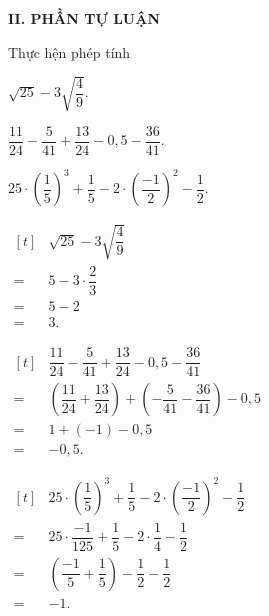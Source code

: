 	\noindent\textbf{II. PHẦN TỰ LUẬN}
	\setcounter{ex}{0}
		\begin{ex}%
			Thực hện phép tính
		\begin{enumEX}{2} 
		\item $\sqrt{25} - 3\sqrt{\dfrac{4}{9}}.$
		\item $\dfrac{11}{24} - \dfrac{5}{41} + \dfrac{13}{24} - 0{,}5 - \dfrac{36}{41}.$
		\item $25\cdot \left(\dfrac{1}{5} \right)^3 + \dfrac{1}{5} - 2\cdot \left( \dfrac{-1}{2}\right)^2 - \dfrac{1}{2} .$
			\end{enumEX}
		\loigiai
		{
				\begin{enumEX}{2}
				\item $\begin{aligned}[t]
				&\sqrt{25} - 3\sqrt{\dfrac{4}{9}}\\ = & 5 - 3\cdot \dfrac{2}{3}\\ =& 5 - 2 \\= &3.
					\end{aligned}$
				\item  $\begin{aligned}[t]
				&	\dfrac{11}{24} - \dfrac{5}{41} + \dfrac{13}{24} - 0,5 - \dfrac{36}{41}\\
				=& \left( \dfrac{11}{24} + \dfrac{13}{24}\right) + \left( - \dfrac{5}{41} - \dfrac{36}{41}\right) - 0,5\\
				=& 1 + (-1) - 0,5\\
			=& - 0{,}5.
				\end{aligned}$
					\item $\begin{aligned}[t]
				&	25\cdot \left(\dfrac{1}{5} \right)^3 + \dfrac{1}{5} - 2\cdot \left( \dfrac{-1}{2}\right)^2 - \dfrac{1}{2} \\
				=& 25\cdot \dfrac{-1}{125} + \dfrac{1}{5} - 2\cdot \dfrac{1}{4} - \dfrac{1}{2}\\
				=& \left(\dfrac{-1}{5} + \dfrac{1}{5}\right) -\dfrac{1}{2} -  \dfrac{1}{2}\\
				=& -1.
					\end{aligned}$
					\end{enumEX}
							
		}
	\end{ex}
	
